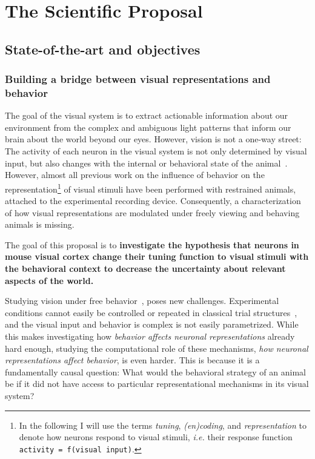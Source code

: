 \documentclass[B2,COG]{ercgrant}
\begin{document}
\maketitle



\chapter{The Scientific Proposal}


\section{State-of-the-art and objectives}\label{sec:stateofart}
\subsection{Building a bridge between visual representations and behavior}
The goal of the visual system is to extract actionable information about our environment from the complex and ambiguous light patterns that inform our brain about the world beyond our eyes.
However, vision is not a one-way street: The activity of each neuron in the visual system is not only determined by visual input, but also changes with the internal or behavioral state of the animal~\parencite{Niell2010-bs, Musall2019-kd, Erisken2014-un, Franke2022-do}. 
However, almost all previous work on the influence of behavior on the representation\footnote{In the following I will use the terms \textit{tuning}, \textit{(en)coding}, and \textit{representation} to denote how neurons respond to visual stimuli, \textit{i.e.} their response function \texttt{activity = f(visual input)}.} of visual stimuli have been performed with restrained animals, attached to the experimental recording device.
Consequently, a characterization of how visual representations are modulated under freely viewing and behaving animals is missing. 

The goal of this proposal is to \textbf{investigate the hypothesis that neurons in mouse visual cortex change their tuning function to visual stimuli with the behavioral context to decrease the uncertainty about relevant aspects of the world.} 

Studying vision under free behavior~\parencite{Parker2022-ac}, poses new challenges. 
Experimental conditions cannot easily be controlled or repeated in classical trial structures~\parencite{Huk2018-ez}, and the visual input and behavior is complex is not easily parametrized. 
While this makes investigating how \textit{behavior affects neuronal representations} already hard enough, studying the computational role of these mechanisms, \textit{how neuronal representations affect behavior}, is even harder.
This is because it is a fundamentally causal question: What would the behavioral strategy of an animal be if it did not have access to particular representational mechanisms in its visual system?
\end{document}
